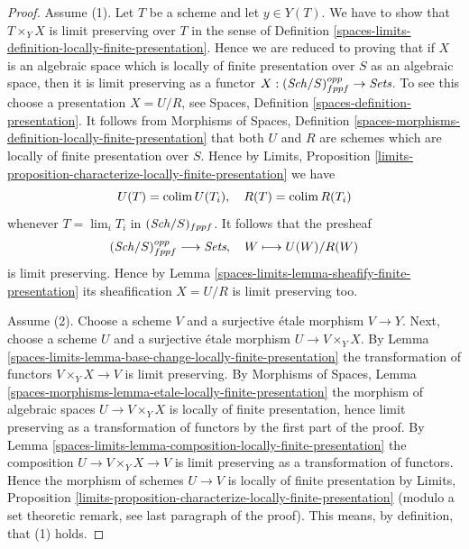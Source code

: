 \begin{proof}
Assume (1). Let $T$ be a scheme and let $y \in Y(T)$. We have to show that
$T \times_Y X$ is limit preserving over $T$ in the sense of
Definition \ref{spaces-limits-definition-locally-finite-presentation}.
Hence we are reduced to proving that if $X$ is an algebraic space which
is locally of finite presentation over $S$ as an algebraic space, then it
is limit preserving as a functor
$X : (\mathit{Sch}/S)_{fppf}^{opp} \to \textit{Sets}$.
To see this choose a presentation $X = U/R$, see
Spaces, Definition \ref{spaces-definition-presentation}.
It follows from
Morphisms of Spaces,
Definition \ref{spaces-morphisms-definition-locally-finite-presentation}
that both $U$ and $R$ are schemes which are locally of finite presentation
over $S$. Hence by
Limits, Proposition
\ref{limits-proposition-characterize-locally-finite-presentation}
we have
$$
U(T) = \operatorname{colim} U(T_i), \quad
R(T) = \operatorname{colim} R(T_i)
$$
whenever $T = \lim_i T_i$ in $(\mathit{Sch}/S)_{fppf}$. It follows
that the presheaf
$$
(\mathit{Sch}/S)_{fppf}^{opp} \longrightarrow \textit{Sets}, \quad
W \longmapsto U(W)/R(W)
$$
is limit preserving. Hence by
Lemma \ref{spaces-limits-lemma-sheafify-finite-presentation}
its sheafification $X = U/R$ is limit preserving too.

\medskip\noindent
Assume (2). Choose a scheme $V$ and a surjective \'etale morphism
$V \to Y$. Next, choose a scheme $U$ and a surjective \'etale morphism
$U \to V \times_Y X$. By
Lemma \ref{spaces-limits-lemma-base-change-locally-finite-presentation}
the transformation of functors $V \times_Y X \to V$ is limit preserving. By
Morphisms of Spaces,
Lemma \ref{spaces-morphisms-lemma-etale-locally-finite-presentation}
the morphism of algebraic spaces $U \to V \times_Y X$ is locally
of finite presentation, hence limit preserving as
a transformation of functors by the first part of the proof. By
Lemma \ref{spaces-limits-lemma-composition-locally-finite-presentation}
the composition $U \to V \times_Y X \to V$ is limit preserving
as a transformation of functors. Hence
the morphism of schemes $U \to V$ is locally of finite presentation by
Limits, Proposition
\ref{limits-proposition-characterize-locally-finite-presentation}
(modulo a set theoretic remark, see last paragraph of the proof).
This means, by definition, that (1) holds.


\end{proof}
